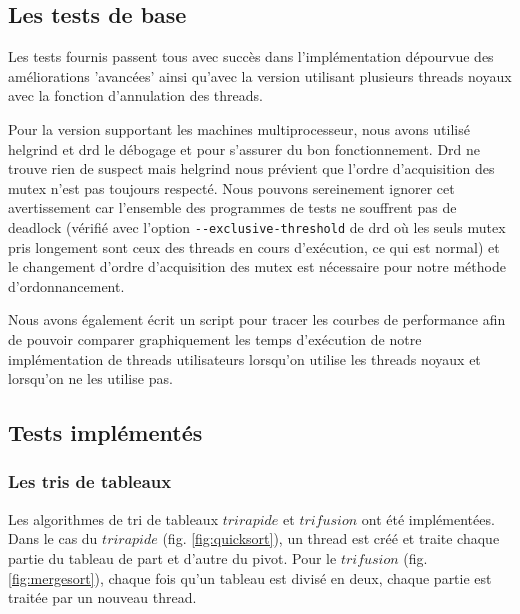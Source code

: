 \subsection{Les tests de base}

Les tests fournis passent tous avec succès dans l'implémentation dépourvue des
améliorations 'avancées' ainsi qu'avec la version utilisant plusieurs threads noyaux avec la fonction d'annulation des threads. 

Pour la version supportant les machines multiprocesseur, nous avons utilisé helgrind et drd le débogage et pour s'assurer du bon fonctionnement. Drd ne trouve rien de suspect mais helgrind nous prévient que l'ordre d'acquisition des mutex n'est pas toujours respecté. Nous pouvons sereinement ignorer cet avertissement car l'ensemble des programmes de tests ne souffrent pas de deadlock (vérifié avec l'option \verb!--exclusive-threshold! de drd où les seuls mutex pris longement sont ceux des threads en cours d'exécution, ce qui est normal) et le changement d'ordre d'acquisition des mutex est nécessaire pour notre méthode d'ordonnancement.

Nous avons également écrit un script pour tracer les courbes de performance
afin de pouvoir comparer graphiquement les temps d'exécution de notre
implémentation de threads utilisateurs lorsqu'on utilise les threads noyaux
et lorsqu'on ne les utilise pas.

\subsection{Tests implémentés}

\subsubsection{Les tris de tableaux} Les algorithmes de tri de tableaux $tri
rapide$ et $tri fusion$ ont été implémentées. Dans le cas du $tri rapide$
(fig. \ref{fig:quicksort}), un thread est créé et traite chaque partie du
tableau de part et d'autre du pivot. Pour le $tri fusion$
(fig. \ref{fig:mergesort}), chaque fois qu'un tableau est divisé en deux,
chaque partie est traitée par un nouveau thread.\\

